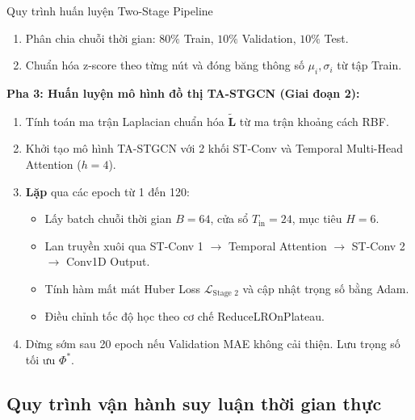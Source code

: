 \begin{algorithm_box}{Quy trình huấn luyện Two-Stage Pipeline}
{\begin{enumerate}
    \item Phân chia chuỗi thời gian: $80\%$ Train, $10\%$ Validation, $10\%$ Test.
    \item Chuẩn hóa z-score theo từng nút và đóng băng thông số $\mu_i, \sigma_i$ từ tập Train.
\end{enumerate}
\textbf{Pha 3: Huấn luyện mô hình đồ thị TA-STGCN (Giai đoạn 2):}
\begin{enumerate}
    \item Tính toán ma trận Laplacian chuẩn hóa $\tilde{\mathbf{L}}$ từ ma trận khoảng cách RBF.
    \item Khởi tạo mô hình TA-STGCN với 2 khối ST-Conv và Temporal Multi-Head Attention ($h=4$).
    \item \textbf{Lặp} qua các epoch từ 1 đến 120:
    \begin{itemize}
        \item Lấy batch chuỗi thời gian $B=64$, cửa sổ $T_{\text{in}}=24$, mục tiêu $H=6$.
        \item Lan truyền xuôi qua ST-Conv 1 $\to$ Temporal Attention $\to$ ST-Conv 2 $\to$ Conv1D Output.
        \item Tính hàm mất mát Huber Loss $\mathcal{L}_{\text{Stage 2}}$ và cập nhật trọng số bằng Adam.
        \item Điều chỉnh tốc độ học theo cơ chế ReduceLROnPlateau.
    \end{itemize}
    \item Dừng sớm sau 20 epoch nếu Validation MAE không cải thiện. Lưu trọng số tối ưu $\Phi^*$.
\end{enumerate}
}
\label{algo:training_pipeline}
\end{algorithm_box}

\subsection{Quy trình vận hành suy luận thời gian thực}
\label{sec:quy_trinh_suy_luan}

